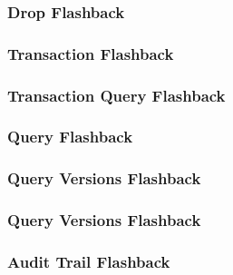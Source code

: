\subsubsection{Drop Flashback}

\subsubsection{Transaction Flashback}

\subsubsection{Transaction Query Flashback}

\subsubsection{Query Flashback}

\subsubsection{Query Versions Flashback}

\subsubsection{Query Versions Flashback}

\subsubsection{Audit Trail Flashback}



